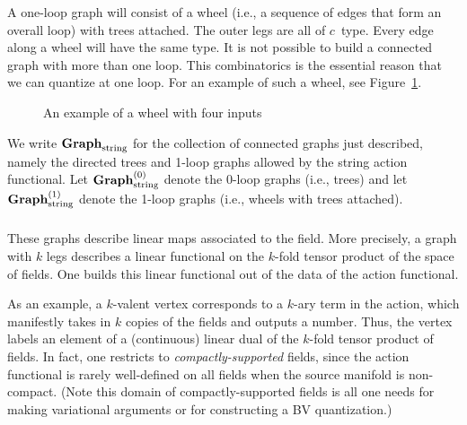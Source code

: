 A one-loop graph will consist of a wheel (i.e., a sequence of edges that form an overall loop)
with trees attached.
The outer legs are all of $c$~type.
Every edge along a wheel will have the same type.
It is not possible to build a connected graph with more than one loop.
This combinatorics is the essential reason that we can quantize at one loop.
For an example of such a wheel, 
see Figure~\ref{fig:wheel}.

\begin{figure}
\caption{An example of a wheel with four inputs}
\label{fig:wheel}
\end{figure}

We write ${\bf Graph}_{\rm string}$ for the collection of connected graphs just described,
namely the directed trees and 1-loop graphs allowed by the string action functional.
Let ${\bf Graph}_{\rm string}^{(0)}$ denote the 0-loop graphs (i.e., trees) and let ${\bf Graph}_{\rm string}^{(1)}$ denote the 1-loop graphs (i.e., wheels with trees attached).

\subsubsection{}

These graphs describe linear maps associated to the field.
More precisely, a graph with $k$ legs describes a linear functional on the $k$-fold tensor product of the space of fields.
One builds this linear functional out of the data of the action functional.

As an example, a $k$-valent vertex corresponds to a $k$-ary term in the action,
which manifestly takes in $k$ copies of the fields and outputs a number.
Thus, the vertex labels an element of a (continuous) linear dual of the $k$-fold tensor product of fields.
In fact, one restricts to {\em compactly-supported} fields,
since the action functional is rarely well-defined on all fields when the source manifold is non-compact.
(Note this domain of compactly-supported fields is all one needs for making variational arguments or for constructing a BV quantization.)

